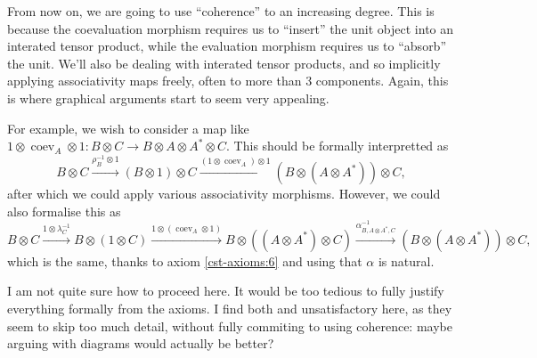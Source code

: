 \documentclass[a4paper,11pt]{article}
\theoremstyle{plain}
\theoremstyle{remark}
\newenvironment{remark}
  {\pushQED{\qed}\renewcommand{\qedsymbol}{$\triangle$}\remarkx}
  {\popQED\endremarkx}
\newcommand{\coev}{\operatorname{coev}}
\begin{document}
\begin{remark}
From now on, we are going to use ``coherence'' to an increasing degree.  This is because the coevaluation morphism requires us to ``insert'' the unit object into an interated tensor product, while the evaluation morphism requires us to ``absorb'' the unit.  We'll also be dealing with interated tensor products, and so implicitly applying associativity maps freely, often to more than 3 components.  Again, this is where graphical arguments start to seem very appealing.

For example, we wish to consider a map like $1\otimes\coev_A\otimes 1 \colon B\otimes C \to B\otimes A\otimes A^*\otimes C$.  This should be formally interpretted as
\[ B\otimes C \xrightarrow{\rho_B^{-1}\otimes 1}
(B\otimes 1)\otimes C \xrightarrow{(1\otimes\coev_A)\otimes 1}
(B\otimes(A\otimes A^*))\otimes C, \]
after which we could apply various associativity morphisms.  However, we could also formalise this as
\[ B\otimes C \xrightarrow{1\otimes\lambda_C^{-1}}
B\otimes (1\otimes C) \xrightarrow{1\otimes(\coev_A\otimes 1)}
B\otimes((A\otimes A^*)\otimes C) \xrightarrow{\alpha_{B,A\otimes A^*,C}^{-1}}
(B\otimes(A\otimes A^*))\otimes C, \]
which is the same, thanks to axiom \ref{cst-axioms:6} and using that $\alpha$ is natural.

I am not quite sure how to proceed here.  It would be too tedious to fully justify everything formally from the axioms.  I find both \cite{EGNO_TensorCategories} and \cite{NT_CQGsBook} unsatisfactory here, as they seem to skip too much detail, without fully commiting to using coherence: maybe arguing with diagrams would actually be better?
\end{remark}
\end{document}
